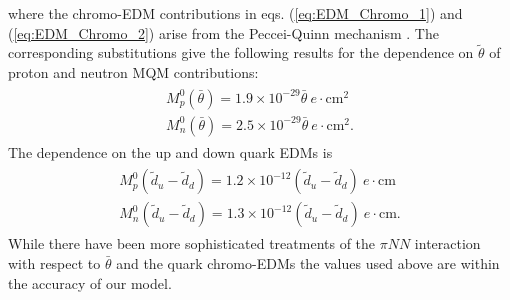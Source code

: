 \documentclass[8pt,a4paper, twoside]{report}
\begin{document}
where the chromo-EDM contributions in eqs. (\ref{eq:EDM_Chromo_1}) and (\ref{eq:EDM_Chromo_2}) arise from the Peccei-Quinn mechanism \cite{Peccei1977, Pospelov2005}. 
The corresponding substitutions give the following results for the dependence on $\tilde{\theta}$ of  proton and neutron MQM contributions:
\begin{align}
\begin{split}
M_{p}^0(\bar{\theta}) = 1.9 \times 10^{-29}\bar{\theta} \ e\cdot\text{cm}^2 \\
M_{n}^0(\bar{\theta}) = 2.5 \times 10^{-29}\bar{\theta} \ e\cdot\text{cm}^2.
\end{split}
\end{align}
The dependence  on the up and down quark EDMs is
\begin{align} 
\begin{split}
M_{p}^0(\tilde{d}_u - \tilde{d}_d) = 1.2 \times 10^{-12}(\tilde{d}_u - \tilde{d}_d) \ e\cdot\text{cm} \\
M_{n}^0(\tilde{d}_u - \tilde{d}_d) = 1.3 \times 10^{-12}(\tilde{d}_u - \tilde{d}_d) \ e\cdot\text{cm}. 
\end{split}
\end{align}
While there have been more sophisticated treatments of the  $\pi NN$ interaction with respect to $\bar{\theta}$\cite{Vries2015, Engel2013, Yamanaka2017, Chupp2018} and the quark chromo-EDMs \cite{Fuyuto2013, Seng2018, Engel2013, Yamanaka2017, Chupp2018} the values used above are within the accuracy of our model.  
\end{document}
